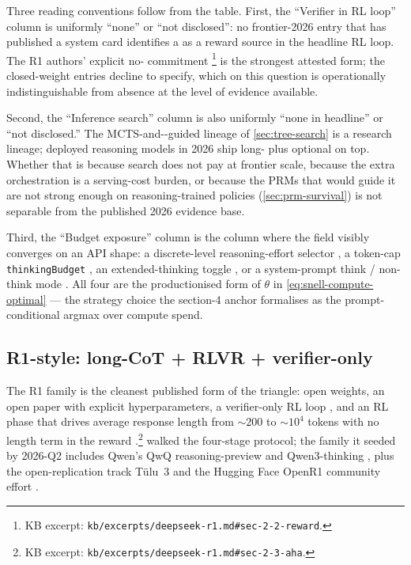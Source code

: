 Three reading conventions follow from the table. First, the
``Verifier in RL loop'' column is uniformly ``none'' or ``not
disclosed'': no frontier-2026 entry that has published a system card
identifies a  as a reward source in the headline RL loop. The R1
authors' explicit no- commitment
\citep[\S 2.2]{deepseek-r1}\footnote{KB excerpt:
\nolinkurl{kb/excerpts/deepseek-r1.md#sec-2-2-reward}.} is the strongest
attested form; the closed-weight entries decline to specify, which on
this question is operationally indistinguishable from absence at the
level of evidence available.

Second, the ``Inference search'' column is also uniformly ``none in
headline'' or ``not disclosed.'' The MCTS-and--guided lineage of
\cref{sec:tree-search} is a research lineage; deployed reasoning models
in 2026 ship long- plus optional  on top. Whether
that is because search does not pay at frontier scale, because the
extra orchestration is a serving-cost burden, or because the PRMs that
would guide it are not strong enough on reasoning-trained policies
(\cref{sec:prm-survival}) is not separable from the published 2026
evidence base.

Third, the ``Budget exposure'' column is the column where the field
visibly converges on an API shape: a discrete-level reasoning-effort
selector , a token-cap
\texttt{thinkingBudget} , an
extended-thinking toggle , or a system-prompt
think / non-think mode . All four are the
productionised form of $\theta$ in \cref{eq:snell-compute-optimal} ---
the strategy choice the section-4 anchor formalises as the
prompt-conditional argmax over compute spend.

\subsection{R1-style: long-CoT + RLVR + verifier-only}
\label{sec:frontier-r1-family}

The R1 family is the cleanest published form of the triangle: open
weights, an open paper with explicit hyperparameters, a verifier-only
RL loop \citep[\S 2.2]{deepseek-r1}, and an RL phase that drives
average response length from $\sim\!200$ to $\sim\!10^4$ tokens with
no length term in the reward
\citep[\S 2.3]{deepseek-r1}.\footnote{KB excerpt:
\nolinkurl{kb/excerpts/deepseek-r1.md#sec-2-3-aha}.} 
walked the four-stage protocol; the family it seeded by 2026-Q2
includes Qwen's QwQ reasoning-preview  and Qwen3-thinking
, plus the open-replication
track Tülu~3 \citep{tulu3} and the Hugging Face OpenR1 community effort
.

